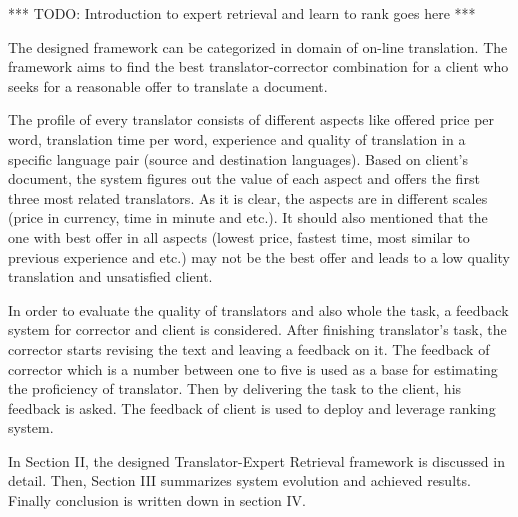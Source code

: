 *** TODO: Introduction to expert retrieval and learn to rank goes here ***

The designed framework can be categorized in domain of on-line translation. The framework aims to find the best translator-corrector combination for a client who seeks for a reasonable offer to translate a document.

The profile of every translator consists of different aspects like offered price per word, translation time per word, experience and quality of translation in a specific language pair (source and destination languages). Based on client's document, the system figures out the value of each aspect and offers the first three most related translators. As it is clear, the aspects are in different scales (price in currency, time in minute and etc.). It should also mentioned that the one with best offer in all aspects (lowest price, fastest time, most similar to previous experience and etc.) may not be the best offer and leads to a low quality translation and unsatisfied client.

In order to evaluate the quality of translators and also whole the task, a feedback system for corrector and client is considered. After finishing translator's task, the corrector starts revising the text and leaving a feedback on it. The feedback of corrector which is a number between one to five is used as a base for estimating the proficiency of translator. Then by delivering the task to the client, his feedback is asked. The feedback of client is used to deploy and leverage ranking system.

In Section II, the designed Translator-Expert Retrieval framework is discussed in detail. Then, Section III summarizes system evolution and achieved results. Finally conclusion is written down in section IV.
